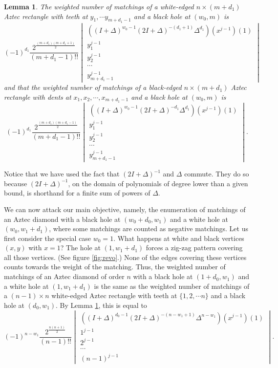 \documentclass[10pt,reqno]{amsart}
\theoremstyle{plain}
\newtheorem{Lem}[Thm]{Lemma}
\theoremstyle{definition}
\theoremstyle{remark}
\begin{document}
\begin{Lem}\label{Lem:koloro}
The weighted number of matchings of
a white-edged $n\times (m+d_1)$ Aztec rectangle with teeth at
$y_1,\dotsb y_{m+d_1-1}$ and a black hole at $(w_0,m)$ is
\begin{equation}
(-1)^{d_1} \frac{2^{\frac{(m+d_1)(m+d_1+1)}{2} }}{(m+d_1-1)!!}
\begin{vmatrix}
((I+\Delta)^{w_0-1} (2I+\Delta)^{-(d_1+1)} \Delta^{d_1})(x^{j-1})(1) \\
y_1^{j-1} \\
y_2^{j-1} \\
\dotsb \\
y_{m+d_1-1}^{j-1}
\end{vmatrix}
\end{equation}
and that the weighted number of matchings of a black-edged $n\times (m+d_1)$
Aztec 
rectangle with dents at $x_1,x_2,\dotsb ,x_{m+d_1-1}$
 and a black hole at $(w_0,m)$ is
\begin{equation}
(-1)^{d_1} \frac{2^{\frac{(m+d_1)(m+d_1-1)}{2} }}{(m+d_1-1)!!}
\begin{vmatrix}
((I+\Delta)^{w_0-1} (2I+\Delta)^{-d_1} \Delta^{d_1})(x^{j-1})(1) \\
y_1^{j-1} \\
y_2^{j-1} \\
\dotsb \\
y_{m+d_1-1}^{j-1}
\end{vmatrix}.
\end{equation}
\end{Lem}
Notice that we have used the fact that $(2I+\Delta)^{-1}$ and
$\Delta$ commute. They do so because $(2I+\Delta)^{-1}$, on the domain of
polynomials of degree lower than a given bound, is shorthand
for a finite sum of powers of $\Delta$.

We can now attack our main objective, namely, the enumeration of matchings
of an Aztec diamond with a black hole at $(w_0+d_0,w_1)$ and
a white hole at $(w_0,w_1+d_1)$, where some matchings are counted as
negative matchings. Let us first consider the special case $w_0=1$. 
What happens at white and black vertices $(x,y)$ with $x=1$? The hole
at $(1,w_1+d_1)$ forces a zig-zag pattern covering all those vertices.
(See figure \ref{fig:revo}.) None of the edges covering these vertices
counts towards the weight of the matching. Thus, the weighted number of
matchings of an Aztec diamond of order $n$ with
a black hole at $(1+d_0,w_1)$ and
a white hole at $(1,w_1+d_1)$ is the same as the weighted number of
matchings of a $(n-1)\times n$ white-edged Aztec rectangle with teeth
at $\{1,2,\dotsb n\} $ and a black hole at $(d_0,w_1)$. By
Lemma \ref{Lem:koloro}, this is equal to
\begin{equation}\label{eq:agur}
(-1)^{n-w_1} \frac{2^{\frac{n(n+1)}{2} }}{(n-1)!!}
\begin{vmatrix}
((I+\Delta)^{d_0-1} (2I+\Delta)^{-(n-w_1+1)} \Delta^{n-w_1})(x^{j-1})(1) \\
1^{j-1} \\
2^{j-1} \\
\dotsb \\
(n-1)^{j-1}
\end{vmatrix}.
\end{equation}
\end{document}

